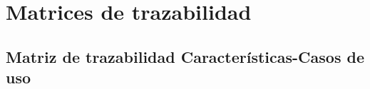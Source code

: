 \documentclass[12pt, a4paper, titlepage]{article}
\begin{document}
\section{Matrices de trazabilidad}  
\subsection{\large Matriz de trazabilidad Características-Casos de uso}

  
\end{document}
